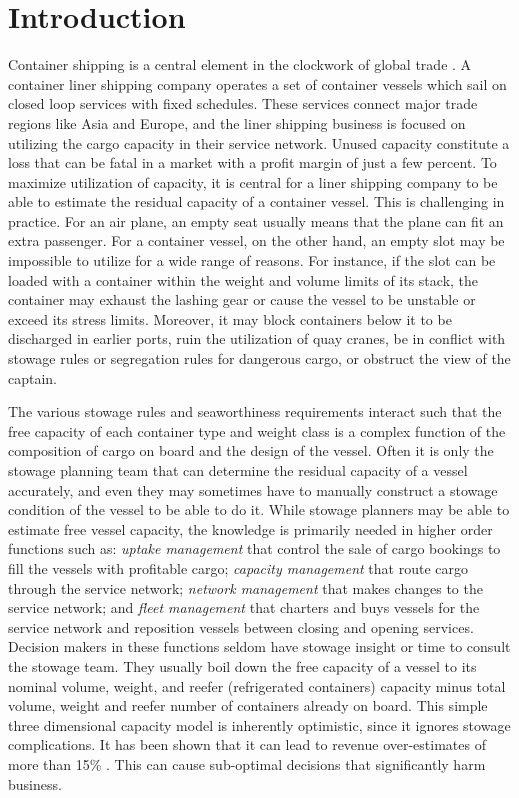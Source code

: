 \documentclass[citeauthoryear]{llncs}
\begin{document}
\section{Introduction}
Container shipping is a central element in the clockwork of global trade \cite{EC13}. A container liner shipping company operates a set of container vessels which sail on closed loop services with fixed schedules. These services connect major trade regions like Asia and Europe, and the liner shipping business is focused on utilizing the cargo capacity in their service network. Unused capacity constitute a loss that can be fatal in a market with a profit margin of just a few percent.  
To maximize utilization of capacity, it is central for a liner shipping company to be able to estimate the residual capacity of a container vessel. This is challenging in practice. For an air plane, an empty seat usually means that the plane can fit an extra passenger. For a container vessel, on the other hand, an empty slot may be impossible to utilize for a wide range of reasons. For instance, if the slot can be loaded with a container within the weight and volume limits of its stack, the container may exhaust the lashing gear or cause the vessel to be unstable or exceed its stress limits. Moreover, it may block containers below it to be discharged in earlier ports, ruin the utilization of quay cranes, be in conflict with stowage rules or segregation rules for dangerous cargo, or obstruct the view of the captain. 

The various stowage rules and seaworthiness requirements interact such that the free capacity of each container type and weight class is a complex function of the composition of cargo on board and the design of the vessel. Often it is only the stowage planning team that can determine the residual capacity of a vessel accurately, and even they may sometimes have to manually construct a stowage condition of the vessel to be able to do it. While stowage planners may be able to estimate free vessel capacity, the knowledge is primarily needed in higher order functions such as: {\em uptake management} that control the sale of cargo bookings to fill the vessels with profitable cargo; {\em capacity management} that route cargo through the service network; {\em network management} that makes changes to the service network; and {\em fleet management} that charters and buys vessels for the service network and reposition vessels between closing and opening services. Decision makers in these functions seldom have stowage insight or time to consult the stowage team. They usually boil down the free capacity of a vessel to its nominal volume, weight, and reefer (refrigerated containers) capacity minus total volume, weight and reefer number of containers already on board. This simple three dimensional capacity model is inherently optimistic, since it ignores stowage complications. It has been shown that it can lead to revenue over-estimates of more than 15\% \cite{AlbertosThesis}. This can cause sub-optimal decisions that significantly harm business.
\end{document}

